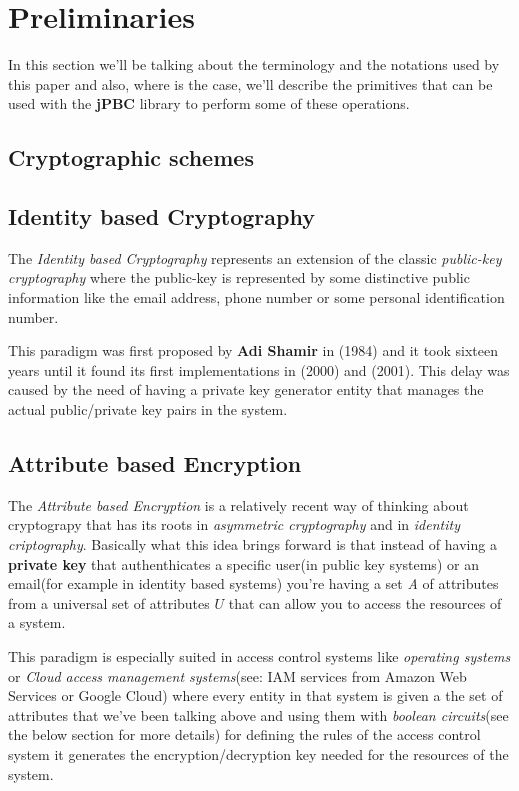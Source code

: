 \documentclass[12pt]{article}
\begin{document}
\section{Preliminaries}

In this section we'll be talking about the terminology and the notations used by this paper and also, where is the case, we'll describe the primitives that can be used with the \textbf{jPBC} library to perform some of these operations.  

\subsection{Cryptographic schemes}

\subsection{Identity based Cryptography}

The \textit{Identity based Cryptography} represents an extension of the classic \textit{public-key cryptography} where the public-key is represented by some distinctive public information like the email address, phone number or some personal identification number.

This paradigm was first proposed by \textbf{Adi Shamir} in \cite{shamirid}(1984) and it took sixteen years until it found its first implementations in \cite{sok}(2000) and \cite{bf}(2001). This delay was caused by the need of having a private key generator entity that manages the actual public/private key pairs in the system. 

\subsection{Attribute based Encryption}

The \textit{Attribute based Encryption} is a relatively recent way of thinking about cryptograpy that has its roots in \textit{asymmetric cryptography} and in \textit{identity criptography}. Basically what this idea brings forward is that instead of having a \textbf{private key} that authenthicates a specific user(in public key systems) or an email(for example in identity based systems) you're having a set \textit{A} of attributes from a universal set of attributes $U$ that can allow you to access the resources of a system. 

This paradigm is especially suited in access control systems like \textit{operating systems} or \textit{Cloud access management systems}(see: IAM services from Amazon Web Services or Google Cloud) where every entity in that system is given a the set of attributes that we've been talking above and using them with \textit{boolean circuits}(see the below section for more details) for defining the rules of the access control system it generates the encryption/decryption key needed for the resources of the system.  
\end{document}

